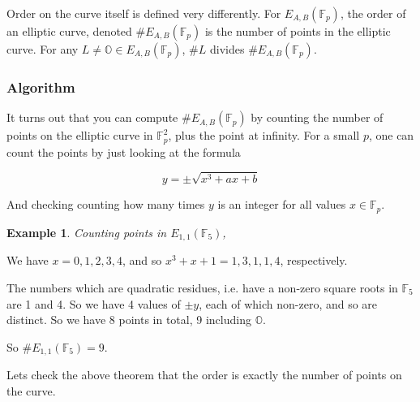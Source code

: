 \documentclass[]{article}
\newtheorem{benexample}{Example}
\newcommand{\OS}{\mathbb{O}}
\newcommand{\F}{\mathbb{F}}
\begin{document}
Order on the curve itself is defined very differently. 
For $E_{A,B}(\F_p)$, the order of an elliptic curve, denoted $\# E_{A,B}(\F_p)$ is the number of points in the elliptic curve. For any $L \ne \OS \in E_{A,B}(\F_p)$, $\# L$ divides $\# E_{A,B}(\F_p)$. 

\subsubsection{Algorithm}

It turns out that you can compute $\# E_{A,B}(\F_p)$ by counting the number of points on the elliptic curve in $\F_p^2$, plus the point at infinity. For a small $p$, one can count the points by just looking at the formula

$$y=\pm \sqrt{x^3+ax+b}$$

And checking counting how many times $y$ is an integer for all values $x \in \F_p$.

\begin{tcolorbox}[breakable,
	enhanced,
	standard jigsaw,
	opacityback=0]

	\noindent \begin{benexample}
		Counting points in $E_{1,1}(\F_5)$,
	\end{benexample}

	\noindent We have $x = 0,1,2,3,4$, and so $x^3+x+1 = 1,3,1,1,4$, respectively.

	\noindent The numbers which are quadratic residues, i.e. have a non-zero square roots in $\F_5$ are 1 and 4. So we have 4 values of $\pm y$, each of which non-zero, and so are distinct. So we have 8 points in total, 9 including $\OS$.

	\noindent So $\# E_{1,1}(\F_5) = 9$.
\end{tcolorbox}

Lets check the above theorem that the order is exactly the number of points on the curve.
\end{document}

